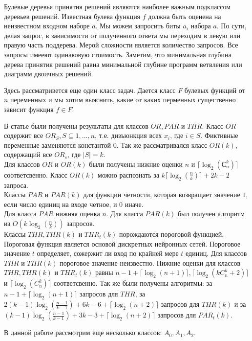 \documentclass[oneside, final, 12pt]{extreport}
\begin{document}
	Булевые деревья принятия решений являются наиболее важным подклассом деревьев решений. Известная булева функция $f$ должна быть оценена
	на неизвестном входном наборе $a$. Мы можем запросить биты $a_i$ набора $a$. 	
	По сути, делая запрос, в зависимости от полученного ответа мы переходим в левую или правую часть поддерева. 
	Мерой сложности является количество запросов. Все запросы имееют одинаковую стоимость. Заметим, что минимальная глубина дерева принятия
	решений равна минимальной глубине программ ветвления или диаграмм двоичных решений.\cite{wegener}
	
	Здесь рассматривется еще один класс задач. Дается класс $F$ булевых функций от $n$ переменных и мы хотим выяснить, какие от каких 
	перменных существенно зависит функция $f \in F$.
	
	В статье  \cite{tokio} были получены результаты для классов $OR, PAR$ и $THR$. Класс $OR$ содержит все $OR_S, S \subseteq {1, \ldots, n}$, 
	т.е. дизъюнкция всех $x_i$, где $i \in S$. Фиктивные переменные заменяются константой $0$. Так же рассматривался класс  $OR(k)$, содержащий
	все $OR_s$, где $|S| = k$.\\
	Для классов $OR$ и $OR(k)$ были получены нижние оценки  $n$ и $\lceil \log_2(С_n^k) \rceil$ соответсвенно.
	Класс $OR(k)$ можно распознать за $k\lceil \log_2(\frac{n}{k}) \rceil + 2k - 2$ запроса.\\
	Классы $PAR$ и $PAR(k)$ для функции четности, которая возвращает значение $1$, если число единиц на входе четное, и $0$ иначе. \\
	Для класса $PAR$ нижняя оценка $n$. Для класса $PAR(k)$ был получен алгоритм из $O(k\log_2(\frac{n}{k}))$ запросов. \\
	Классы $THR, THR(k)$ и $THR_t(k)$ порождаются пороговой функцией. Пороговая функция является основой дискретных нейронных сетей.
	Пороговое значение $t$ определяет, сожержит ли вход по крайней мере $t$ единиц. Для классов $THR$ и $THR(k)$ пороговое значение неизвестно.
	Нижние оценки для классов $THR, THR(k)$ и $THR_t(k)$ равны $n-1 + \lceil \log_2(n+1) \rceil, \lceil \log_2(kC_n^k + 2) \rceil$ и $\lceil \log_2(C_n^k) \rceil$ 
	соответсвенно. Так же были получены алгоритмы: за $n-1 + \lceil \log_2(n+1) \rceil$ запросов для $THR$, за 
	$2(k-1)\log_2(\frac{n-1}{k-1}) + 6k - 6 + \lceil \log_2(n+2) \rceil$ запросов для $THR(k)$ и за $(k-1)\log_2(\frac{n-1}{k-1}) + 3k - 3 + \lceil \log_2(n+2) \rceil$ 
	запросов для $PAR_t(k)$.
	
	В данной работе рассмотрим еще несколько классов: $A_0, A_1, A_2$.
	
\end{document}
